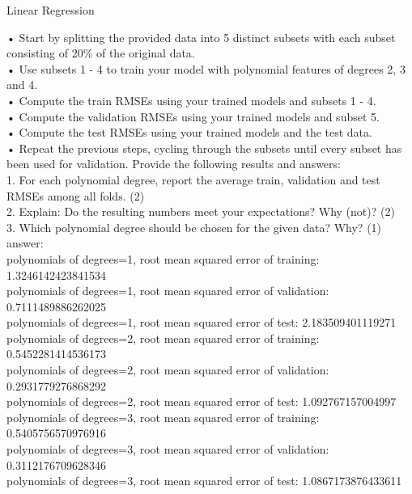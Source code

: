 \documentclass[
	ngerman,
     solution=true
	]{tudaexercise}
\begin{document}
\begin{task}{Linear Regression}
\begin{subtask}[1c)]
• Start by splitting the provided data into 5 distinct subsets with each subset consisting of 20\% of the original data.\\[15pt]
• Use subsets 1 - 4 to train your model with polynomial features of degrees 2, 3 and 4.\\[15pt]
• Compute the train RMSEs using your trained models and subsets 1 - 4.\\[15pt]
• Compute the validation RMSEs using your trained models and subset 5.\\[15pt]
• Compute the test RMSEs using your trained models and the test data.\\[15pt]
• Repeat the previous steps, cycling through the subsets until every subset has been used for validation.
Provide the following results and answers:\\[15pt]
1. For each polynomial degree, report the average train, validation and test RMSEs among all folds. (2)\\[15pt]
2. Explain: Do the resulting numbers meet your expectations? Why (not)? (2)\\[15pt]
3. Which polynomial degree should be chosen for the given data? Why? (1)
\\[15pt]
answer:\\[15pt]
polynomials of degrees=1, root mean squared error of training: 1.3246142423841534\\
polynomials of degrees=1, root mean squared error of validation: 0.7111489886262025\\
polynomials of degrees=1, root mean squared error of test: 2.183509401119271\\
polynomials of degrees=2, root mean squared error of training: 0.5452281414536173\\
polynomials of degrees=2, root mean squared error of validation: 0.2931779276868292\\
polynomials of degrees=2, root mean squared error of test: 1.092767157004997\\
polynomials of degrees=3, root mean squared error of training: 0.5405756570976916\\
polynomials of degrees=3, root mean squared error of validation: 0.3112176709628346\\
polynomials of degrees=3, root mean squared error of test: 1.0867173876433611\\


\end{subtask}
\end{task}
\end{document}
